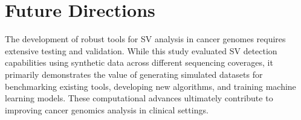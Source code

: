 


\section{Future Directions}

The development of robust tools for SV analysis in cancer genomes requires 
extensive testing and validation. While this study evaluated SV detection 
capabilities using synthetic data across different sequencing coverages, 
it primarily demonstrates the value of generating simulated datasets for 
benchmarking existing tools, developing new algorithms, and training machine 
learning models. These computational advances ultimately contribute to 
improving cancer genomics analysis in clinical settings.

